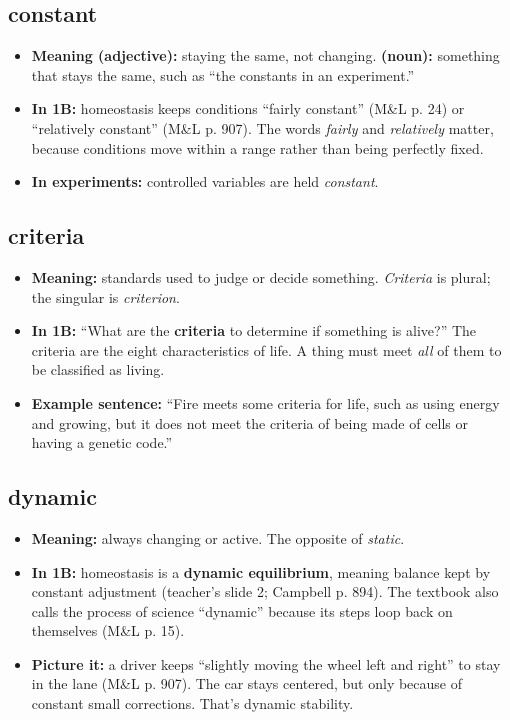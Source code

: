 \documentclass[11pt,letterpaper]{article}
\begin{document}
\subsection{constant}
\begin{itemize}
  \item \textbf{Meaning (adjective):} staying the same, not changing. \textbf{(noun):} something that stays the same, such as ``the constants in an experiment.''
  \item \textbf{In 1B:} homeostasis keeps conditions ``fairly constant'' (M\&L p. 24) or ``relatively constant'' (M\&L p. 907). The words \emph{fairly} and \emph{relatively} matter, because conditions move within a range rather than being perfectly fixed.
  \item \textbf{In experiments:} controlled variables are held \emph{constant}.
\end{itemize}

\subsection{criteria}
\begin{itemize}
  \item \textbf{Meaning:} standards used to judge or decide something. \emph{Criteria} is plural; the singular is \emph{criterion}.
  \item \textbf{In 1B:} ``What are the \textbf{criteria} to determine if something is alive?'' The criteria are the eight characteristics of life. A thing must meet \emph{all} of them to be classified as living.
  \item \textbf{Example sentence:} ``Fire meets some criteria for life, such as using energy and growing, but it does not meet the criteria of being made of cells or having a genetic code.''
\end{itemize}

\subsection{dynamic}
\begin{itemize}
  \item \textbf{Meaning:} always changing or active. The opposite of \emph{static}.
  \item \textbf{In 1B:} homeostasis is a \textbf{dynamic equilibrium}, meaning balance kept by constant adjustment (teacher's slide 2; Campbell p. 894). The textbook also calls the process of science ``dynamic'' because its steps loop back on themselves (M\&L p. 15).
  \item \textbf{Picture it:} a driver keeps ``slightly moving the wheel left and right'' to stay in the lane (M\&L p. 907). The car stays centered, but only because of constant small corrections. That's dynamic stability.
\end{itemize}
\end{document}
